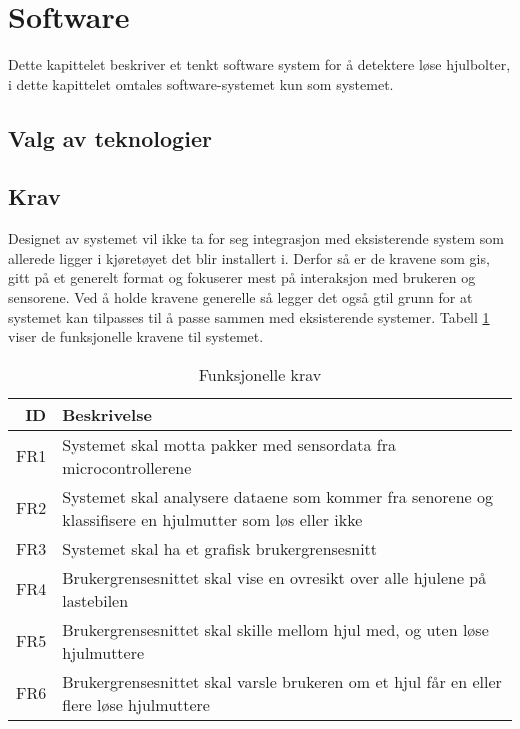 \section{Software}
Dette kapittelet beskriver et tenkt software system for å detektere løse hjulbolter, i dette kapittelet omtales software-systemet kun som systemet.

\subsection{Valg av teknologier}

\subsection{Krav}
Designet av systemet vil ikke ta for seg integrasjon med eksisterende system som allerede ligger i kjøretøyet det blir installert i. Derfor så er de kravene som gis, gitt på et generelt format og fokuserer mest på interaksjon med brukeren og sensorene. Ved å holde kravene generelle så legger det også gtil grunn for at systemet kan tilpasses til å passe sammen med eksisterende systemer. Tabell \ref{tab:frequirements} viser de funksjonelle kravene til systemet.
\begin{table}[h]
\caption{Funksjonelle krav}
\label{tab:frequirements}
\begin{tabularx}{\textwidth}{r|X}
ID & Beskrivelse \\ 
\hline
FR1 & Systemet skal motta pakker med sensordata fra microcontrollerene \\
FR2 & Systemet skal analysere dataene som kommer fra senorene og klassifisere en hjulmutter som løs eller ikke \\
FR3 & Systemet skal ha et grafisk brukergrensesnitt \\
FR4 & Brukergrensesnittet skal vise en ovresikt over alle hjulene på lastebilen \\
FR5 & Brukergrensesnittet skal skille mellom hjul med, og uten løse hjulmuttere \\
FR6 & Brukergrensesnittet skal varsle brukeren om et hjul får en eller flere løse hjulmuttere \\
\hline
\end{tabularx}
\end{table}

